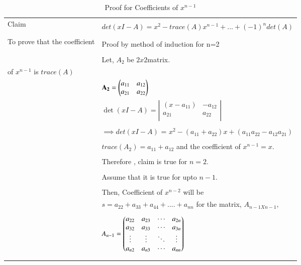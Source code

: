 \documentclass[journal,12pt]{IEEEtran}
\begin{document}
\begin{longtable}{|l|l|}
\hline
\multirow{3}{*}{Claim} & \\
&  $det(xI-A) = x^2 - trace(A)x^{n-1}+...+(-1)^ndet(A)$ \\
&\\
\hline
\multirow{3}{*}{To prove that the coefficient} &\\
& Proof by method of induction for n=2\\ 
&\\
& Let, $A_2$ be $2x2$matrix.\\ 
of $x^{n-1}$ is $trace(A)$ 
&\\
& $\mathbf{A_2}=\begin{pmatrix}a_{11}&a_{12}\\a_{21}&a_{22}\end{pmatrix}$\\
& $\det(xI-A)= \left|
                \begin{array}{ccc}
                (x-a_{11}) & -a_{12}\\
                a_{21}& a_{22}\\
                \end{array} \right|$  \\
&\\
& $\implies det(xI-A)$ = $x^2 - (a_{11}+a_{22})x+(a_{11}a_{22}-a_{12}a_{21})$\\
 &\\
& $\boxed {trace(A_2) = a_{11}+a_{12}}$ and the coefficient of $\boxed{x^{n-1} = x}$.\\
&\\
& Therefore , claim is true for $n=2$. \\
&\\
& Assume that it is true for upto $n-1$.\\
& \\
& Then, Coefficient of $x^{n-2}$ will be\\
& $s=a_{22}+a_{33}+a_{44}+....+a_{nn}$ for the matrix, $A_{n-1Xn-1},$\\
&\\
& $A_{n-1} = \begin{pmatrix}a_{22}&a_{23}&\cdots &a_{2n} \\
a_{32}&a_{33}&\cdots &a_{3n} \\
\vdots & \vdots & \ddots & \vdots\\
a_{n2}&a_{n3}&\cdots &a_{nn}\end{pmatrix}$\\
&\\
\hline
\caption{Proof for Coefficients of $x^{n-1}$}
\label{table:1}
\end{longtable}
\newpage
\renewcommand{\thetable}{2}
\end{document}
